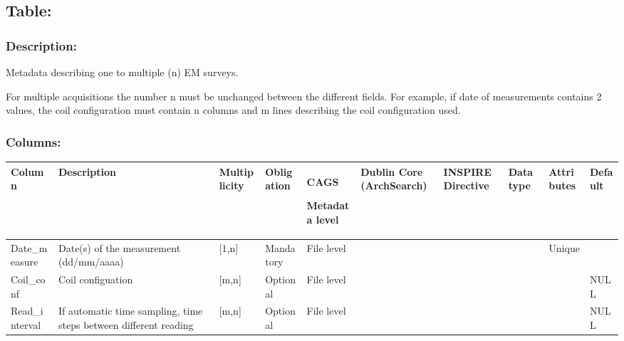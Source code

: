 \documentclass[letterpaper,10pt,english]{sphinxmanual}
\begin{document}
\subsection{Table: }
\label{\detokenize{schema_documentation:table-em-metadata}}

\subsubsection{Description:}
\label{\detokenize{schema_documentation:description-3}}\label{\detokenize{schema_documentation:id22}}
Metadata describing one to multiple (n) EM surveys.

For multiple acquisitions the number n must be unchanged between the
different fields. For example, if date of measurements contains 2
values, the coil configuration must contain n columns and m lines
describing the coil configuration used.


\subsubsection{Columns:}
\label{\detokenize{schema_documentation:columns-4}}\label{\detokenize{schema_documentation:id23}}

\begin{savenotes}\sphinxattablestart
\centering
\begin{tabulary}{\linewidth}[t]{|T|T|T|T|T|T|T|T|T|T|}
\hline
\sphinxstyletheadfamily 
Column
&\sphinxstyletheadfamily 
Description
&\sphinxstyletheadfamily 
Multiplicity
&\sphinxstyletheadfamily 
Obligation
&\sphinxstyletheadfamily 
CAGS

Metadata level
&\sphinxstyletheadfamily 
Dublin Core (ArchSearch)
&\sphinxstyletheadfamily 
INSPIRE Directive
&\sphinxstyletheadfamily 
Data type
&\sphinxstyletheadfamily 
Attributes
&\sphinxstyletheadfamily 
Default
\\
\hline
Date\_measure
&
Date(s) of the measurement (dd/mm/aaaa)
&
{[}1,n{]}
&
Mandatory
&
File level
&&&&
Unique
&\\
\hline
Coil\_conf
&
Coil configuation
&
{[}m,n{]}
&
Optional
&
File level
&&&&&
NULL
\\
\hline
Read\_interval
&
If automatic time sampling, time steps   between different reading
&
{[}m,n{]}
&
Optional
&
File level
&&&&&
NULL
\\
\hline
\end{tabulary}
\par
\sphinxattableend\end{savenotes}
\end{document}
